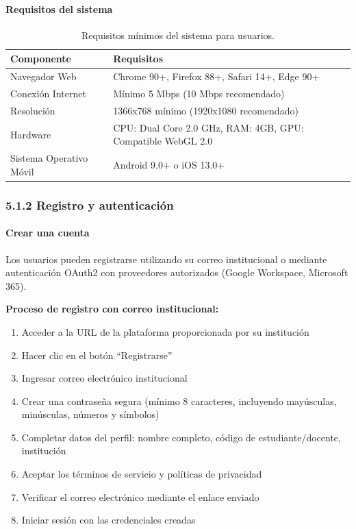 \paragraph{Requisitos del sistema}

\begin{table}[H]
	\centering
	\caption{Requisitos mínimos del sistema para usuarios.}
	\begin{tabular}{p{4cm} p{9cm}}
		\toprule
		Componente & Requisitos \\
		\midrule
		Navegador Web & Chrome 90+, Firefox 88+, Safari 14+, Edge 90+ \\
		Conexión Internet & Mínimo 5 Mbps (10 Mbps recomendado) \\
		Resolución & 1366x768 mínimo (1920x1080 recomendado) \\
		Hardware & CPU: Dual Core 2.0 GHz, RAM: 4GB, GPU: Compatible WebGL 2.0 \\
		Sistema Operativo Móvil & Android 9.0+ o iOS 13.0+ \\
		\bottomrule
	\end{tabular}
\end{table}

\subsubsection{5.1.2 Registro y autenticación}

\paragraph{Crear una cuenta}

Los usuarios pueden registrarse utilizando su correo institucional o mediante autenticación OAuth2 con proveedores autorizados (Google Workspace, Microsoft 365).

\textbf{Proceso de registro con correo institucional:}

\begin{enumerate}
	\item Acceder a la URL de la plataforma proporcionada por su institución
	\item Hacer clic en el botón ``Registrarse''
	\item Ingresar correo electrónico institucional
	\item Crear una contraseña segura (mínimo 8 caracteres, incluyendo mayúsculas, minúsculas, números y símbolos)
	\item Completar datos del perfil: nombre completo, código de estudiante/docente, institución
	\item Aceptar los términos de servicio y políticas de privacidad
	\item Verificar el correo electrónico mediante el enlace enviado
	\item Iniciar sesión con las credenciales creadas
\end{enumerate}

